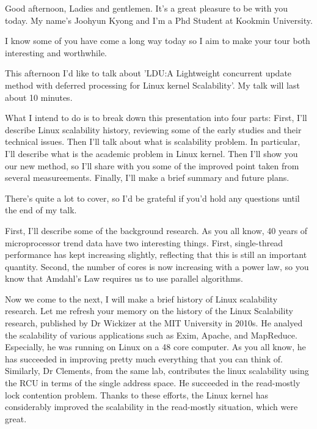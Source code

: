 Good afternoon, Ladies and gentlemen. 
It's a great pleasure to be with you today.
My name's Joohyun Kyong and I'm a Phd Student at Kookmin University.

I know some of you have come a long way today so I aim to make your tour both 
interesting and worthwhile.

This afternoon I'd like to talk about 'LDU:A Lightweight concurrent update
method with deferred processing for Linux kernel Scalability'.
My talk will last about 10 minutes.

What I intend to do is to break down this presentation into four parts: 
First, I'll describe Linux scalability history, reviewing some of the early
studies and their technical issues.
Then I'll talk about what is scalability problem.
In particular, I'll describe what is the academic problem in Linux kernel.
Then I'll show you our new method, so I'll share with you some of the
improved point taken from several measureements. 
Finally, I'll make a brief summary and future plans.

There's quite a lot to cover, so I'd be grateful if you'd hold any questions
until the end of my talk.

First, I'll describe some of the background research.
As you all know, 40 years of microprocessor trend data have two interesting
things.
First, single-thread performance has kept increasing slightly, 
reflecting that this is still an important quantity. 
Second, the number of cores is now increasing with a power law, so you 
know that Amdahl's Law requires us to use parallel algorithms. 

Now we come to the next, I will make a brief history of Linux
scalability research.
Let me refresh your memory on the history of the Linux Scalability research,
published by Dr Wickizer at the MIT University in 2010s. 
He analyed the scalability of various applications such as Exim, Apache, and
MapReduce.
Especially, he was running on Linux on a 48 core computer.
As you all know, he has succeeded in improving pretty much everything that you
can think of.
Similarly, Dr Clements, from the same lab, contributes the linux scalability
using the RCU in terms of the single address space.
He succeeded in the read-mostly lock contention problem.
Thanks to these efforts, the Linux kernel has considerably improved the
scalability in the read-mostly situation, which were great.

